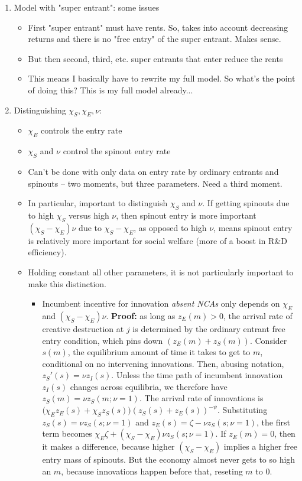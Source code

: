 \documentclass[12pt,english]{article}
\theoremstyle{remark}
\begin{document}
\begin{enumerate}
\begin{itemize}
	\end{itemize}
	\item Model with "super entrant": some issues
	\begin{itemize}
		\item First "super entrant" must have rents. So, takes into account decreasing returns and there is no "free entry" of the super entrant. Makes sense.
		\item But then second, third, etc. super entrants that enter reduce the rents
		\item This means I basically have to rewrite my full model. So what's the point of doing this? This is my full model already...
	\end{itemize}
	\item Distinguishing $\chi_S, \chi_E, \nu$:
	\begin{itemize}
		\item $\chi_E$ controls the entry rate
		\item $\chi_S$ and $\nu$ control the spinout entry rate
		\item Can't be done with only data on entry rate by ordinary entrants and spinouts -- two moments, but three parameters. Need a third moment.
		\item In particular, important to distinguish $\chi_S$ and $\nu$. If getting spinouts due to high $\chi_S$ versus high $\nu$, then spinout entry is more important $(\chi_S - \chi_E) \nu$ due to $\chi_S - \chi_E$, as opposed to high $\nu$, means spinout entry is relatively more important for social welfare (more of a boost in R\&D efficiency).
		\item Holding constant all other parameters, it is not particularly important to make this distinction.
		\begin{itemize}
			\item Incumbent incentive for innovation \textit{absent NCAs} only depends on $\chi_E$ and $(\chi_S -\chi_E) \nu$. \textbf{Proof:} as long as $z_E(m) > 0$, the arrival rate of creative destruction at $j$ is determined by the ordinary entrant free entry condition, which pins down $(z_E(m) + z_S(m))$. Consider $s(m)$, the equilibrium amount of time it takes to get to $m$, conditional on no intervening innovations. Then, abusing notation, $z_S'(s) = \nu z_I(s)$. Unless the time path of incumbent innovation $z_I(s)$ changes across equilibria, we therefore have $z_S(m) = \nu z_S(m; \nu = 1)$. The arrival rate of innovations is $\big(\chi_Ez_E(s) + \chi_Sz_S(s)\big) (z_S(s) + z_E(s))^{-\psi}$. Substituting $z_S(s) = \nu z_S(s; \nu = 1)$ and $z_E(s) = \zeta - \nu z_S(s; \nu = 1)$, the first term becomes $\chi_E\zeta + (\chi_S - \chi_E) \nu z_S(s; \nu = 1)$. If $z_E(m) = 0$, then it makes a difference, because higher $(\chi_S -\chi_E)$ implies a higher free entry mass of spinouts. But the economy almost never gets to so high an $m$, because innovations happen before that, reseting $m$ to $0$.

\end{itemize}
\end{itemize}
\end{enumerate}
\end{document}
